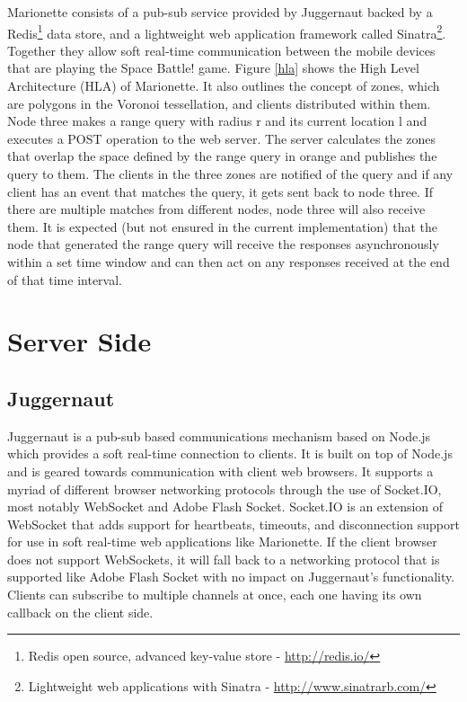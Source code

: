 \documentclass[12pt]{report}	%
\theoremstyle{definition}
\theoremstyle{remark}
\begin{document}
Marionette consists of a pub-sub service provided by Juggernaut backed
by a Redis\footnote{Redis open source, advanced key-value store - \url{http://redis.io/}} 
data store, and a lightweight web application framework
called Sinatra\footnote{Lightweight web applications with Sinatra - \url{http://www.sinatrarb.com/}}. 
Together they allow soft real-time communication between
the mobile devices that are playing the Space Battle! game. Figure
\ref{hla} shows the High Level Architecture (HLA) of
Marionette. It also outlines the concept of zones, which are polygons in
the Voronoi tessellation, and clients distributed within them. Node three
makes a range query with radius r and its current location l and
executes a POST operation to the web server. The server calculates the
zones that overlap the space defined by the range query in orange and
publishes the query to them. The clients in the three zones are notified
of the query and if any client has an event that matches the query, it
gets sent back to node three. If there are multiple matches from
different nodes, node three will also receive them. It is expected 
(but not ensured in the current implementation) that
the node that generated the range query will receive the responses
asynchronously within a set time window and can then act on any
responses received at the end of that time interval.

\section{Server Side}

\subsection{Juggernaut}

Juggernaut is a pub-sub based communications mechanism based on Node.js which provides a
soft real-time connection to clients. It is built on top of Node.js and
is geared towards communication with client web browsers. It supports a
myriad of different browser networking protocols through the use of
Socket.IO, most notably WebSocket and Adobe Flash Socket. Socket.IO is
an extension of WebSocket that adds support for heartbeats, timeouts,
and disconnection support for use in soft real-time web applications
like Marionette. If the client browser does not support WebSockets, it
will fall back to a networking protocol that is supported like Adobe Flash 
Socket with no impact on Juggernaut's functionality. Clients can
subscribe to multiple channels at once, each one having its own callback
on the client side.
\end{document}
